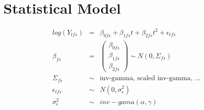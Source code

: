 \documentclass{article}
\begin{document}


\newpage

\section{Statistical Model} 

\begin{eqnarray}
\nonumber log(Y_{tfs}) &=&  \beta_{0fs} + \beta_{1fs}t + \beta_{2fs}t^2 + \epsilon_{tfs}  \\
\nonumber \beta_{fs} &=& \left(\begin{array}{c}
    \beta_{0fs}   \\ 
    \beta_{1fs}  \\ 
    \beta_{2fs}  
\end{array}\right) \sim N(0, \Sigma_{fs}) \\
\nonumber \Sigma_{fs}  &\sim& \mbox{inv-gamma, scaled inv-gamma, ...} \\ 
\nonumber \epsilon_{tfs}  &\sim& N(0,\sigma_{\epsilon}^2) \\
\nonumber \sigma_{\epsilon}^2  &\sim& inv-gama(\alpha,\gamma) \\
\label{mod3}
\end{eqnarray}






\end{document}

